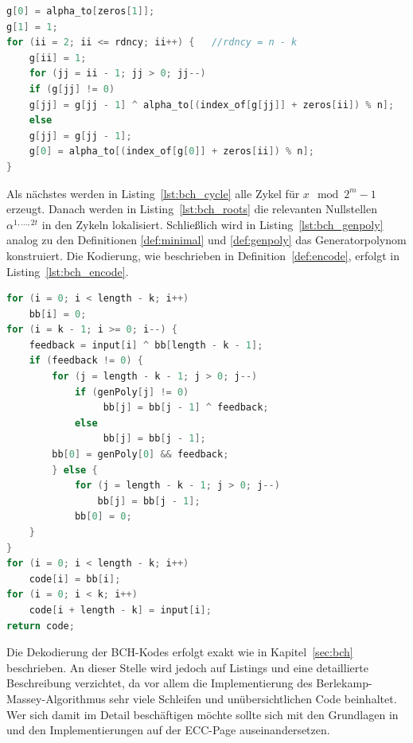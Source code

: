 \begin{lstlisting}[caption=Konstruieren des Generatorpolynoms, label={lst:bch_genpoly}, language=C++]
g[0] = alpha_to[zeros[1]];
g[1] = 1;
for (ii = 2; ii <= rdncy; ii++) {	//rdncy = n - k
    g[ii] = 1;
    for (jj = ii - 1; jj > 0; jj--)
    if (g[jj] != 0)
    g[jj] = g[jj - 1] ^ alpha_to[(index_of[g[jj]] + zeros[ii]) % n];
    else
    g[jj] = g[jj - 1];
    g[0] = alpha_to[(index_of[g[0]] + zeros[ii]) % n];
}
\end{lstlisting}



Als nächstes werden in Listing~\ref{lst:bch_cycle} alle Zykel für $x \mod 2^m-1$ erzeugt. Danach werden in Listing~\ref{lst:bch_roots} die relevanten Nullstellen $\alpha^{1,...,2t}$ in den Zykeln lokalisiert. Schließlich wird in Listing~\ref{lst:bch_genpoly} analog zu den Definitionen \ref{def:minimal} und \ref{def:genpoly} das Generatorpolynom konstruiert. Die Kodierung, wie beschrieben in Definition~\ref{def:encode}, erfolgt in Listing~\ref{lst:bch_encode}.
\vspace{0.5cm}
\begin{lstlisting}[caption=Kodierung mit dem Generatorpolynom, label={lst:bch_encode}, language=C++]
for (i = 0; i < length - k; i++)
	bb[i] = 0;
for (i = k - 1; i >= 0; i--) {
    feedback = input[i] ^ bb[length - k - 1];
    if (feedback != 0) {
        for (j = length - k - 1; j > 0; j--)
        	if (genPoly[j] != 0)
       			 bb[j] = bb[j - 1] ^ feedback;
        	else
       			 bb[j] = bb[j - 1];
        bb[0] = genPoly[0] && feedback;
        } else {
        	for (j = length - k - 1; j > 0; j--)
       			bb[j] = bb[j - 1];
        	bb[0] = 0;
    }
}
for (i = 0; i < length - k; i++)
	code[i] = bb[i];
for (i = 0; i < k; i++)
	code[i + length - k] = input[i];
return code;
\end{lstlisting}

Die Dekodierung der BCH-Kodes erfolgt exakt wie in Kapitel~\ref{sec:bch} beschrieben. An dieser Stelle wird jedoch auf Listings und eine detaillierte Beschreibung verzichtet, da vor allem die Implementierung des Berlekamp-Massey-Algorithmus sehr viele Schleifen und unübersichtlichen Code beinhaltet. Wer sich damit im Detail beschäftigen möchte sollte sich mit den Grundlagen in \cite[S. 54ff]{morelos2006art} und den Implementierungen auf der ECC-Page\cite{eccpage} auseinandersetzen.


